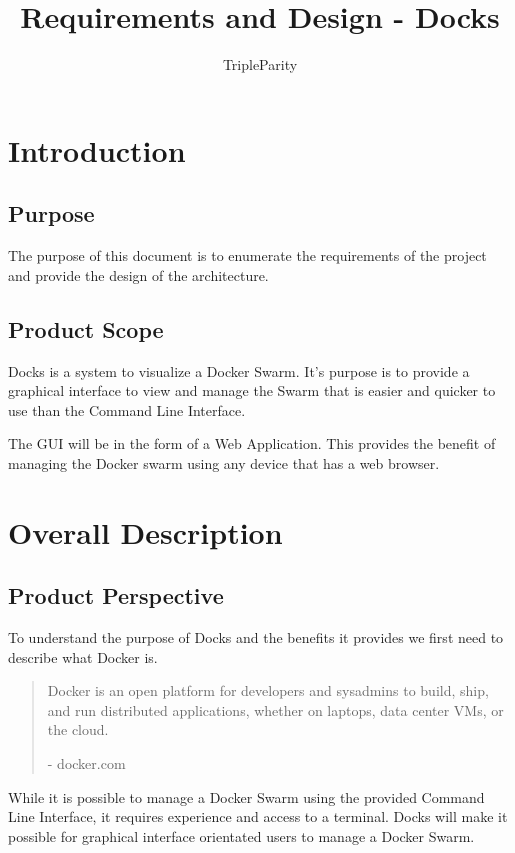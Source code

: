 \documentclass[]{article}
\title{Requirements and Design - Docks}
\author{TripleParity}
\date{}
\begin{document}
\maketitle


\tableofcontents

\pagebreak


\section{Introduction}
\subsection{Purpose}
The purpose of this document is to enumerate the requirements of the project and provide the design of the architecture.

\subsection{Product Scope}
Docks is a system to visualize a Docker Swarm. It's purpose is to provide a graphical interface to view and manage the Swarm that is easier and quicker to use than the Command Line Interface.

The GUI will be in the form of a Web Application. This provides the benefit of managing the Docker swarm
using any device that has a web browser.

\section{Overall Description}
\subsection{Product Perspective}
To understand the purpose of Docks and the benefits it provides we first need to describe what Docker is.

\begin{quotation}
Docker is an open platform for developers and sysadmins to build, ship, and run distributed applications, whether on laptops, data center VMs, or the cloud.

- docker.com
\end{quotation}

While it is possible to manage a Docker Swarm using the provided Command Line Interface, it requires experience and access to a terminal. Docks will make it possible for graphical interface orientated users to manage a Docker Swarm.
\end{document}
